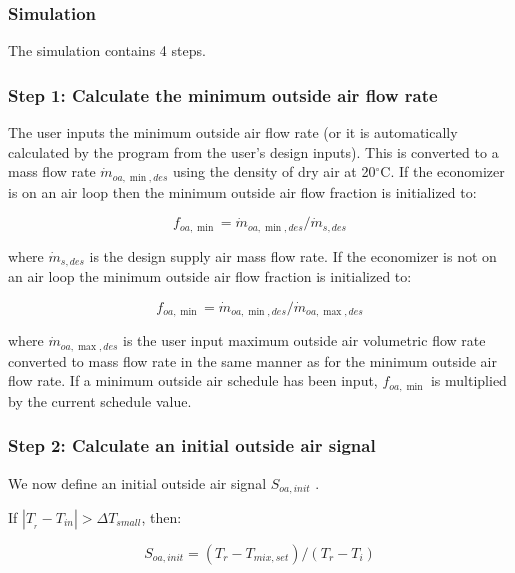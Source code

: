 \subsubsection{Simulation}\label{simulation-000}

The simulation contains 4 steps.

\subsubsection{Step 1: Calculate the minimum outside air flow rate}\label{step-1-Calculate-the-minimum-outside-air-flow-rate}

The user inputs the minimum outside air flow rate (or it is automatically calculated by the program from the user's design inputs). This is converted to a mass flow rate \({\dot m_{oa,\min ,des}}\) using the density of dry air at 20\(^{\circ}\)C. If the economizer is on an air loop then the minimum outside air flow fraction is initialized to:

\begin{equation}
{f_{oa,\min }} = {\dot m_{oa,\min ,des}}/{\dot m_{s,des}}
\end{equation}

where \({\dot m_{s,des}}\) is the design supply air mass flow rate. If the economizer is not on an air loop the minimum outside air flow fraction is initialized to:

\begin{equation}
{f_{oa,\min }} = {\dot m_{oa,\min ,des}}/{\dot m_{oa,\max ,des}}
\end{equation}

where \({\dot m_{oa,\max ,des}}\) is the user input maximum outside air volumetric flow rate converted to mass flow rate in the same manner as for the minimum outside air flow rate. If a minimum outside air schedule has been input, \({f_{oa,\min }}\) is multiplied by the current schedule value.

\subsubsection{Step 2: Calculate an initial outside air signal}\label{step-2-Calculate-an-initial-outside-air-signal}

We now define an initial outside air signal \({S_{oa,init}}\) .

If \(\left| {{T_{_r}} - {T_{in}}} \right| > \Delta {T_{small}}\), then:

\begin{equation}
{S_{oa,init}} = ({T_r} - {T_{mix,set}})/({T_r} - {T_i})
\end{equation}

